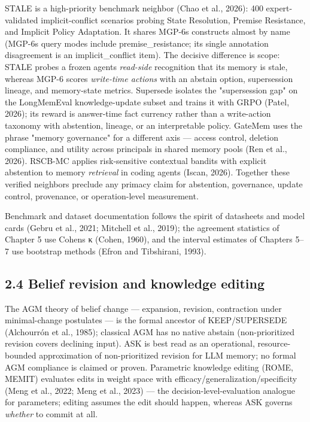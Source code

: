 STALE is a high-priority benchmark neighbor (Chao et al., 2026): 400
expert-validated implicit-conflict scenarios probing State Resolution,
Premise Resistance, and Implicit Policy Adaptation. It shares
MGP-6\textquotesingle s constructs almost by name
(MGP-6\textquotesingle s query modes include premise\_resistance; its
single annotation disagreement is an implicit\_conflict item). The
decisive difference is scope: STALE probes a frozen
agent\textquotesingle s \emph{read-side} recognition that its memory is
stale, whereas MGP-6 scores \emph{write-time actions} with an abstain
option, supersession lineage, and memory-state metrics. Supersede
isolates the "supersession gap" on the LongMemEval knowledge-update
subset and trains it with GRPO (Patel, 2026); its reward is answer-time
fact currency rather than a write-action taxonomy with abstention,
lineage, or an interpretable policy. GateMem uses the phrase "memory
governance" for a different axis --- access control, deletion
compliance, and utility across principals in shared memory pools (Ren et
al., 2026). RSCB-MC applies risk-sensitive contextual bandits with
explicit abstention to memory \emph{retrieval} in coding agents (Iscan,
2026). Together these verified neighbors preclude any primacy claim for
abstention, governance, update control, provenance, or operation-level
measurement.

Benchmark and dataset documentation follows the spirit of datasheets and
model cards (Gebru et al., 2021; Mitchell et al., 2019); the agreement
statistics of Chapter 5 use Cohen\textquotesingle s κ (Cohen, 1960), and
the interval estimates of Chapters 5--7 use bootstrap methods (Efron and
Tibshirani, 1993).

\subsection{2.4 Belief revision and knowledge
editing}\label{belief-revision-and-knowledge-editing}

The AGM theory of belief change --- expansion, revision, contraction
under minimal-change postulates --- is the formal ancestor of
KEEP/SUPERSEDE (Alchourrón et al., 1985); classical AGM has no native
abstain (non-prioritized revision covers declining input). ASK is best
read as an operational, resource-bounded approximation of
non-prioritized revision for LLM memory; no formal AGM compliance is
claimed or proven. Parametric knowledge editing (ROME, MEMIT) evaluates
edits in weight space with efficacy/generalization/specificity (Meng et
al., 2022; Meng et al., 2023) --- the decision-level-evaluation analogue
for parameters; editing assumes the edit should happen, whereas ASK
governs \emph{whether} to commit at all.

